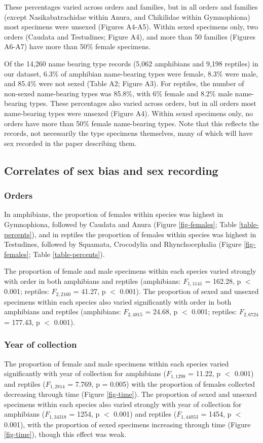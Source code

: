 \documentclass[a4paper, 12pt]{article}
\begin{document}
These percentages varied across orders and families, but in all orders and families (except Nasikabatrachidae within Anura, and Chikilidae within Gymnophiona) most specimens were unsexed (Figures A4-A5). 
Within sexed specimens only, two orders (Caudata and Testudines; Figure A4), and more than 50 families (Figures A6-A7) have more than 50\% female specimens. 

Of the 14,260 name bearing type records (5,062 amphibians and 9,198 reptiles) in our dataset, 6.3\% of amphibian name-bearing types were female, 8.3\% were male, and 85.4\% were not sexed (Table A2; Figure A3). 
For reptiles, the number of non-sexed name-bearing types was 85.8\%, with 6\% female and 8.2\% male name-bearing types. 
These percentages also varied across orders, but in all orders most name-bearing types were unsexed (Figure A4).
Within sexed specimens only, no orders have more than 50\% female name-bearing types.
Note that this reflects the records, not necessarily the type specimens themselves, many of which will have sex recorded in the paper describing them.

\subsection{Correlates of sex bias and sex recording}

\subsubsection{Orders}
In amphibians, the proportion of females within species was highest in Gymnophiona, followed by Caudata and Anura (Figure \ref{fig-females}; Table \ref{table-percents}), and in reptiles the proportion of females within species was highest in Testudines, followed by Squamata, Crocodylia and Rhynchocephalia (Figure \ref{fig-females}; Table \ref{table-percents}).

The proportion of female and male specimens within each species varied strongly with order in both amphibians and reptiles (amphibians: $F_{1,1141}$ = 162.28, p $<$ 0.001; reptiles: $F_{2,2160}$ = 41.27, p $<$ 0.001). 
The proportion of sexed and unsexed specimens within each species also varied significantly with order in both amphibians and reptiles (amphibians: $F_{2,4815}$ = 24.68, p $<$ 0.001; reptiles: $F_{2,6724}$ = 177.43, p $<$ 0.001). 

\subsubsection{Year of collection}
The proportion of female and male specimens within each species varied significantly with year of collection for amphibians ($F_{1,1298}$ =  11.22, p $<$ 0.001) and reptiles ($F_{1,2814}$ = 7.769, p = 0.005) with the proportion of females collected decreasing through time (Figure \ref{fig-time}). 
The proportion of sexed and unsexed specimens within each species also varied strongly with year of collection for amphibians ($F_{1,34318}$ = 1254, p $<$ 0.001) and reptiles ($F_{1,44053}$ = 1454, p $<$ 0.001), with the proportion of sexed specimens increasing through time (Figure \ref{fig-time}), though this effect was weak.
\end{document}
